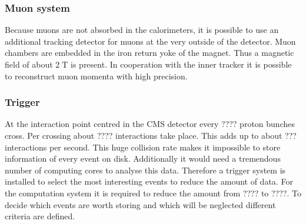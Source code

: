 \subsubsection{Muon system}
	Because muons are not absorbed in the calorimeters, it is possible to use an additional tracking detector for muons at the very outside of the detector. Muon chambers are embedded in the iron return yoke of the magnet. Thus a magnetic field of about $2\;\text{T}$ is present.
	In cooperation with the inner tracker it is possible to reconstruct muon momenta with high precision.
\subsubsection{Trigger}
	At the interaction point centred in the CMS detector every ???? 
	proton bunches cross. Per crossing about ????
	interactions take place. This adds up to about ???
	interactions per second. This huge collision rate makes it impossible to store information of every event on disk. Additionally it would need a tremendous number of computing cores to analyse this data. Therefore a trigger system is installed to select the most interesting events to reduce the amount of data. For the computation system it is required to reduce the amount from ???? to ????.
 	To decide which events are worth storing and which will be neglected different criteria are defined.
	
	